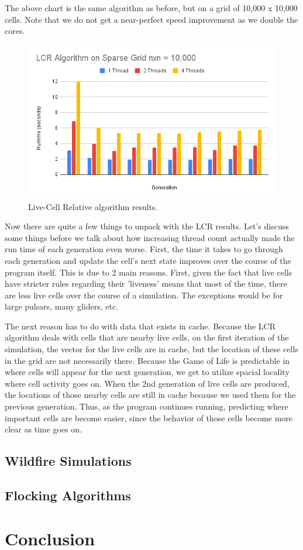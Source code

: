 \documentclass[12pt]{article}
\begin{document}
The above chart is the same algorithm as before, but on a grid of 10,000 x 10,000 cells. Note that we do not get a near-perfect speed improvement as we double the cores. 

\begin{figure}[ht]
\centering
\includegraphics[width=\linewidth]{lcr_10000.PNG}
\caption{\label{fig:chart_3}Live-Cell Relative algorithm results.}
\end{figure}

Now there are quite a few things to unpack with the LCR results. Let's discuss some things before we talk about how increasing thread count actually made the run time of each generation even worse. First, the time it takes to go through each generation and update the cell's next state improves over the course of the program itself. This is due to 2 main reasons. First, given the fact that live cells have stricter rules regarding their 'liveness' means that most of the time, there are less live cells over the course of a simulation. The exceptions would be for large pulsars, many gliders, etc.

The next reason has to do with data that exists in cache. Because the LCR algorithm deals with cells that are nearby live cells, on the first iteration of the simulation, the vector for the live cells are in cache, but the location of these cells in the grid are not necessarily there. Because the Game of Life is predictable in where cells will appear for the next generation, we get to utilize spacial locality where cell activity goes on. When the 2nd generation of live cells are produced, the locations of those nearby cells are still in cache because we used them for the previous generation. Thus, as the program continues running, predicting where important cells are become easier, since the behavior of those cells become more clear as time goes on.

\subsection{Wildfire Simulations}

\subsection{Flocking Algorithms}

\section{Conclusion}
\end{document}

